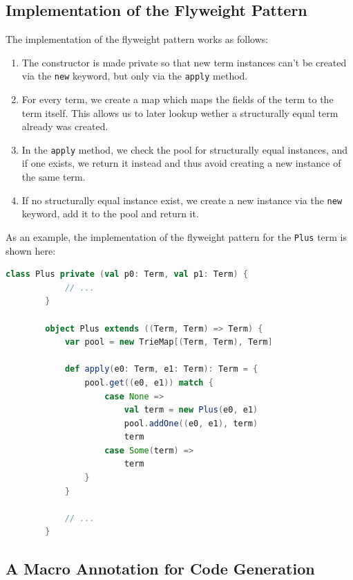 \documentclass[11pt]{article}
\begin{document}
    \subsection{Implementation of the Flyweight Pattern}

    The implementation of the flyweight pattern works as follows:

    \begin{enumerate}
        \item The constructor is made private so that new term instances can't be created via
            the \texttt{new} keyword, but only via the \texttt{apply} method.
        \item For every term, we create a map which maps the fields of the term to the term itself.
            This allows us to later lookup wether a structurally equal term already was created.
        \item In the \texttt{apply} method, we check the pool for structurally equal instances,
            and if one exists, we return it instead and thus avoid creating a new instance of the
            same term.
        \item If no structurally equal instance exist, we create a new instance via the \texttt{new}
            keyword, add it to the pool and return it.
    \end{enumerate}

    As an example, the implementation of the flyweight pattern for the \texttt{Plus} term is shown here:

    \begin{lstlisting}[language=Scala, caption={Implementation of the flyweight pattern.}, label={lst:flyweight-pattern}]
        class Plus private (val p0: Term, val p1: Term) {
            // ...
        }
        
        object Plus extends ((Term, Term) => Term) {
            var pool = new TrieMap[(Term, Term), Term]
        
            def apply(e0: Term, e1: Term): Term = {
                pool.get((e0, e1)) match {
                    case None => 
                        val term = new Plus(e0, e1)
                        pool.addOne((e0, e1), term)
                        term
                    case Some(term) => 
                        term
                }
            }

            // ...
        }       
    \end{lstlisting}

    \subsection{A Macro Annotation for Code Generation}
\end{document}
